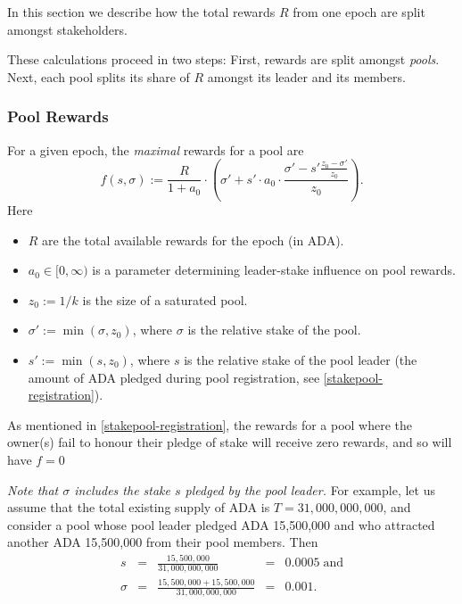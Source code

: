 \documentclass[11pt,a4paper]{article}
\begin{document}
In this section we describe how the total rewards \(R\) from one epoch
are split amongst stakeholders.

These calculations proceed in two steps: First, rewards are split
amongst \emph{pools}. Next, each pool splits its share of \(R\) amongst
its leader and its members.

\subsubsection{Pool Rewards}
\label{pool-rewards}

For a given epoch, the \emph{maximal} rewards for a pool are \[
    f(s,\sigma) :=
    \frac{R}{1 + a_0}
    \cdot
    \left(\sigma' + s'\cdot a_0\cdot\frac{\sigma' - s'\frac{z_0-\sigma'}{z_0}}{z_0}\right).
\] Here

\begin{itemize}
\item
  \(R\) are the total available rewards for the epoch (in ADA).
\item
  \(a_0\in[0,\infty)\) is a parameter determining leader-stake influence
  on pool rewards.
\item
  \(z_0:=1/k\) is the size of a saturated pool.
\item
  \(\sigma':=\min(\sigma, z_0)\), where \(\sigma\) is the relative stake
  of the pool.
\item
  \(s':=\min(s, z_0)\), where \(s\) is the relative stake of the pool
  leader (the amount of ADA pledged during pool registration,
  see \cref{stakepool-registration}).
\end{itemize}

As mentioned in \cref{stakepool-registration}, the rewards for a pool
where the owner(s) fail to honour their pledge of stake will receive
zero rewards, and so will have $f=0$

\emph{Note that \(\sigma\) includes the stake \(s\) pledged by the pool
leader.} For example, let us assume that the total existing supply of
ADA is \(T=31,000,000,000\), and consider a pool whose pool leader
pledged ADA 15,500,000 and who attracted another ADA 15,500,000 from their
pool members. Then \[
\begin{array}{rcccl}
    s                  & = & \displaystyle\frac{15,500,000}{31,000,000,000}              & = & 0.0005\;\text{and} \\[5mm]
    \sigma & = & \displaystyle\frac{15,500,000 + 15,500,000}{31,000,000,000} & = & 0.001. \\
\end{array}
\]
\end{document}
